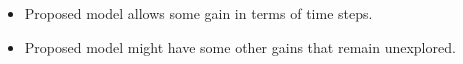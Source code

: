 \begin{itemize}
  \item Proposed model allows some gain in terms
    of time steps.
  \item Proposed model might have some other gains
    that remain unexplored.
\end{itemize}
